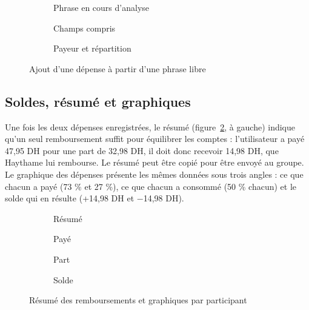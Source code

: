 \begin{figure}[H]
\centering
\begin{subfigure}[t]{0.31\textwidth}\centering{}\caption{Phrase en cours d'analyse}\end{subfigure}\hfill
\begin{subfigure}[t]{0.31\textwidth}\centering{}\caption{Champs compris}\end{subfigure}\hfill
\begin{subfigure}[t]{0.31\textwidth}\centering{}\caption{Payeur et répartition}\end{subfigure}
\caption{Ajout d'une dépense à partir d'une phrase libre}
\label{fig:ecran_phrase}
\end{figure}

\subsection{Soldes, résumé et graphiques}

Une fois les deux dépenses enregistrées, le résumé (figure~\ref{fig:ecran_soldes}, à gauche)
indique qu'un seul remboursement suffit pour équilibrer les comptes : l'utilisateur a payé
47,95 DH pour une part de 32,98 DH, il doit donc recevoir 14,98 DH, que Haythame lui
rembourse. Le résumé peut être copié pour être envoyé au groupe. Le graphique des dépenses
présente les mêmes données sous trois angles : ce que chacun a payé (73 \% et 27 \%), ce que
chacun a consommé (50 \% chacun) et le solde qui en résulte (+14,98 DH et $-$14,98 DH).

\begin{figure}[H]
\centering
\begin{subfigure}[t]{0.235\textwidth}\centering{}\caption{Résumé}\end{subfigure}\hfill
\begin{subfigure}[t]{0.235\textwidth}\centering{}\caption{Payé}\end{subfigure}\hfill
\begin{subfigure}[t]{0.235\textwidth}\centering{}\caption{Part}\end{subfigure}\hfill
\begin{subfigure}[t]{0.235\textwidth}\centering{}\caption{Solde}\end{subfigure}
\caption{Résumé des remboursements et graphiques par participant}
\label{fig:ecran_soldes}
\end{figure}

